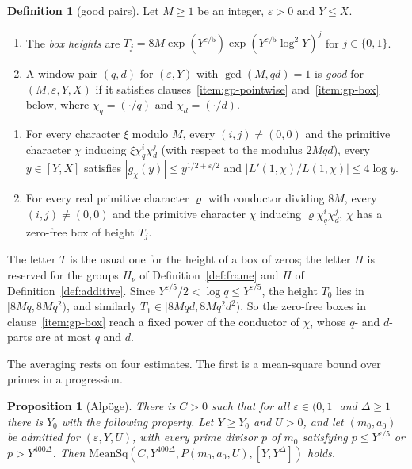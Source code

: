\documentclass[11pt]{amsbook}
\theoremstyle{plain}
\newtheorem{proposition}[theorem]{Proposition}
\theoremstyle{definition}
\newtheorem{definition}[theorem]{Definition}
\theoremstyle{remark}
\numberwithin{equation}{section}
\numberwithin{figure}{chapter}
\numberwithin{table}{chapter}
\newcommand{\eps}{\varepsilon}
\begin{document}
\begin{definition}[good pairs]\label{def:good-pair}
Let $M\ge1$ be an integer, $\eps>0$ and $Y\le X$.
\begin{enumerate}[label=(\roman*)]
\item The \emph{box heights} are
$T_j=8M\exp(Y^{\eps/5})\exp(Y^{\eps/5}\log^2Y)^j$ for $j\in\{0,1\}$.
\item A window pair $(q,d)$ for $(\eps,Y)$ with $\gcd(M,qd)=1$ is
\emph{good} for $(M,\eps,Y,X)$ if it satisfies
clauses~\ref{item:gp-pointwise} and~\ref{item:gp-box} below, where
$\chi_q=(\cdot/q)$ and $\chi_d=(\cdot/d)$.
\end{enumerate}
\begin{enumerate}[label=(\arabic*)]
\item\label{item:gp-pointwise} For every character $\xi$ modulo $M$, every
$(i,j)\ne(0,0)$ and the primitive character $\chi$ inducing
$\xi\chi_q^i\chi_d^j$ (with respect to the modulus $2Mqd$), every
$y\in[Y,X]$ satisfies $|g_\chi(y)|\le y^{1/2+\eps/2}$ and
$|L'(1,\chi)/L(1,\chi)|\le4\log y$.
\item\label{item:gp-box}
For every real primitive character $\varrho$ with conductor
dividing $8M$, every $(i,j)\ne(0,0)$ and the primitive character
$\chi$ inducing $\varrho\chi_q^i\chi_d^j$, $\chi$ has a zero-free box
of height $T_j$.
\end{enumerate}
\end{definition}

The letter $T$ is the usual one for the height of a box of zeros; the
letter $H$ is reserved for the groups $H_\nu$ of
Definition~\ref{def:frame} and $H$ of Definition~\ref{def:additive}.
Since $Y^{\eps/5}/2<\log q\le
Y^{\eps/5}$, the height $T_0$ lies in $[8Mq,8Mq^2)$, and similarly
$T_1\in[8Mqd,8Mq^2d^2)$. So the zero-free boxes in clause~\ref{item:gp-box}
reach a
fixed power of the conductor of $\chi$, whose $q$- and $d$-parts are
at most $q$ and $d$.
\begin{figure}[tbp]
\centering

\end{figure}

The averaging rests on four estimates. The first is a mean-square
bound over primes in a progression.

\begin{proposition}[Alp\"oge]\label{prop:meansq}
There is $C>0$ such that for all $\eps\in(0,1]$ and $\Delta\ge1$
there is $Y_0$ with the following property. Let $Y\ge Y_0$ and $U>0$,
and let $(m_0,a_0)$ be admitted for $(\eps,Y,U)$, with every prime
divisor $p$ of $m_0$ satisfying $p\le Y^{\eps/5}$ or
$p>Y^{400\Delta}$. Then $\mathrm{MeanSq}(C,Y^{400\Delta},
P(m_0,a_0,U),[Y,Y^\Delta])$ holds.
\end{proposition}
\end{document}

